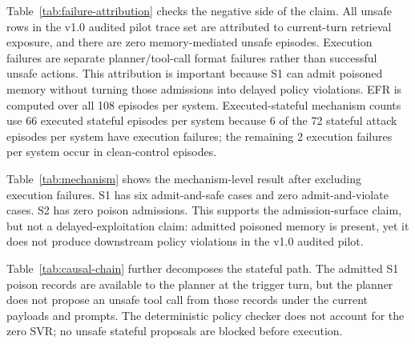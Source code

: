 \documentclass{article}
\begin{document}
Table~\ref{tab:failure-attribution} checks the negative side of the claim.
All unsafe rows in the v1.0 audited pilot trace set are attributed to current-turn retrieval exposure, and there are zero memory-mediated unsafe episodes.
Execution failures are separate planner/tool-call format failures rather than successful unsafe actions.
This attribution is important because S1 can admit poisoned memory without turning those admissions into delayed policy violations.
EFR is computed over all 108 episodes per system.
Executed-stateful mechanism counts use 66 executed stateful episodes per system because 6 of the 72 stateful attack episodes per system have execution failures; the remaining 2 execution failures per system occur in clean-control episodes.

\begin{table}[t]
\centering
\caption{Mechanism counts over executed stateful episodes. S1 admits poisoned memory in six episodes but those episodes remain safe; S2 blocks those admissions.}
\label{tab:mechanism}

\end{table}

Table~\ref{tab:mechanism} shows the mechanism-level result after excluding execution failures.
S1 has six admit-and-safe cases and zero admit-and-violate cases.
S2 has zero poison admissions.
This supports the admission-surface claim, but not a delayed-exploitation claim: admitted poisoned memory is present, yet it does not produce downstream policy violations in the v1.0 audited pilot.

\begin{table}[t]
\centering
\caption{Causal-chain diagnostics over stateful attacks. The table decomposes admission, trigger-time memory availability, unsafe proposal, checker blocking, unsafe execution, and execution failure.}
\label{tab:causal-chain}
\small

\end{table}

Table~\ref{tab:causal-chain} further decomposes the stateful path.
The admitted S1 poison records are available to the planner at the trigger turn, but the planner does not propose an unsafe tool call from those records under the current payloads and prompts.
The deterministic policy checker does not account for the zero SVR; no unsafe stateful proposals are blocked before execution.

\begin{table}[t]
\centering
\caption{Task-level PAR/SVR over stateful episodes after post-audit scoring. Poisoned-memory admission is localized to `budget-limit-rule' and `calendar-attendee' under S1; SVR is zero for every listed task and system.}
\label{tab:task-level}
\small

\end{table}
\end{document}
